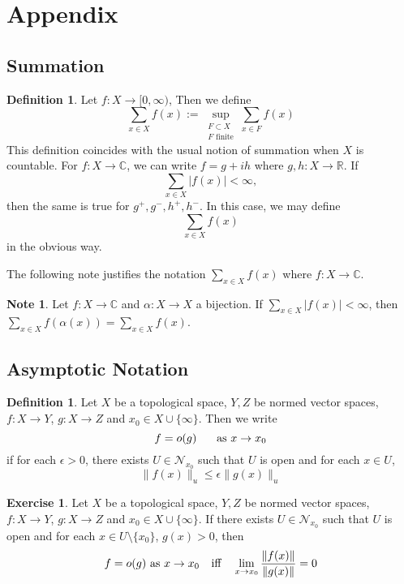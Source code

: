 \documentclass[12pt]{amsart}
\theoremstyle{definition}
\newtheorem{defn}[definition]{Definition}
\newtheorem{note}[definition]{Note}
\newtheorem{ex}[definition]{Exercise}
\newcommand{\al}{\alpha}
\newcommand{\ep}{\epsilon}
\newcommand{\C}{\mathbb{C}}
\newcommand{\R}{\mathbb{R}}
\newcommand{\MN}{\mathcal{N}}
\newcommand{\Rg}{[0,\infty)}
\begin{document}
	
	
	
	
	
	
	
	
	\newpage
	\section{Appendix}
	
	\subsection{Summation}
	
	\begin{defn}
		Let $f:X \rightarrow \Rg$, Then we define $$\sum_{x \in X} f(x) := \sup_{\substack{F \subset X \\ F \text{ finite}}} \sum_{x \in F} f(x)$$ This definition coincides with the usual notion of summation when $X$ is countable. For $f:X \rightarrow \C$, we can write $f = g +ih$ where $g,h:X \rightarrow \R$. If $$\sum_{x \in X}|f(x)| < \infty,$$ then the same is true for $g^+,g^-,h^+,h^-$. In this case, we may define $$\sum_{x \in X} f(x)$$ in the obvious way.
	\end{defn} 
	
	The following note justifies the notation $\sum_{x \in X}f(x)$ where $f:X \rightarrow \C$.
	
	\begin{note}
		Let $f:X \rightarrow \C$ and $\al:X \rightarrow X$ a bijection. If $\sum_{x \in X}|f(x)|< \infty$, then $\sum_{x \in X}f( \al (x)) = \sum_{x \in X}f(x) $.
	\end{note}
	
	\newpage	
	
	\subsection{Asymptotic Notation}
	
	\begin{defn}
	Let $X$ be a topological space, $Y, Z$ be normed vector spaces, $f:X \rightarrow Y$, $g: X \rightarrow Z$ and $x_0 \in X \cup \{\infty\}$. Then we write $$f = o(g) \hspace{.5cm} \text{ as } x \rightarrow x_0$$ if for each $\ep >0$, there exists $U \in \MN_{x_0}$ such that $U$ is open and for each $x \in U$, $$\|f(x)\|_u \leq \ep\|g(x)\|_u$$
	\end{defn}
	
	\begin{ex}
	Let $X$ be a topological space, $Y, Z$ be normed vector spaces, $f:X \rightarrow Y$, $g: X \rightarrow Z$ and $x_0 \in X \cup \{\infty\}$. If there exists $U \in \MN_{x_0}$ such that $U$ is open and for each $x \in U \setminus \{x_0\}$, $g(x) > 0$, then $$f = o(g) \text{ as } x \rightarrow x_0 \hspace{.25cm} \text{ iff } \hspace{.25cm}  \lim_{x \rightarrow x_0} \frac{\| f(x) \|}{\| g(x) \|} = 0$$
	\end{ex}	
	
\end{document}
